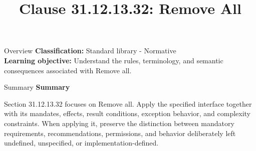 \documentclass[10pt,letterpaper]{article}
\title{Clause 31.12.13.32: Remove All}
\author{}
\date{}
\begin{document}
\maketitle
\begin{CornellOverviewBox}{Overview}
\textbf{Classification:} Standard library - Normative\\[2pt]
\textbf{Learning objective:} Understand the rules, terminology, and semantic consequences associated with Remove all.
\end{CornellOverviewBox}\begin{CornellSummaryBox}{Summary}
{\sffamily\bfseries\color{Accent} Summary}\par\vspace{3pt}Section 31.12.13.32 focuses on Remove all. Apply the specified interface together with its mandates, effects, result conditions, exception behavior, and complexity constraints. When applying it, preserve the distinction between mandatory requirements, recommendations, permissions, and behavior deliberately left undefined, unspecified, or implementation-defined.
\end{CornellSummaryBox}
\end{document}

